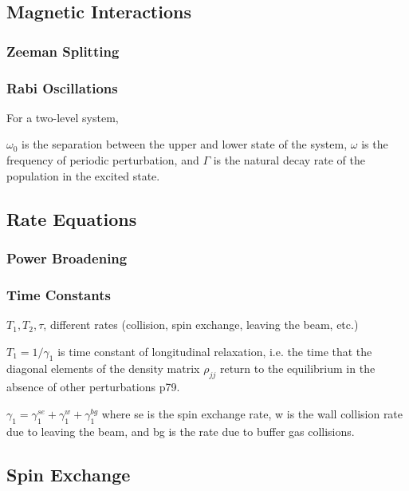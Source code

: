 \subsection{Magnetic Interactions}

\subsubsection{Zeeman Splitting}



\subsubsection{Rabi Oscillations}

For a two-level system, 

$\omega_0$ is the separation between the upper and lower state of the system, $\omega$ is the frequency of periodic perturbation, and $\Gamma$ is the natural decay rate of the population in the excited state.

\subsection{Rate Equations}

\subsubsection{Power Broadening}

\subsubsection{Time Constants}

$T_1, T_2, \tau$, different rates (collision, spin exchange, leaving the beam, etc.)

$T_1 = 1/\gamma_1$ is time constant of longitudinal relaxation,
i.e. the time that the diagonal elements of the density matrix $\rho_{jj}$
return to the equilibrium in the absence of other perturbations
\cite{vanier} p79.

$\gamma_1 = \gamma_1^{se} + \gamma_1^{w} + \gamma_1^{bg} $
where se is the spin exchange rate, w is the wall collision rate due to leaving the beam, and bg is the rate due to buffer gas collisions.

\subsection{Spin Exchange}

